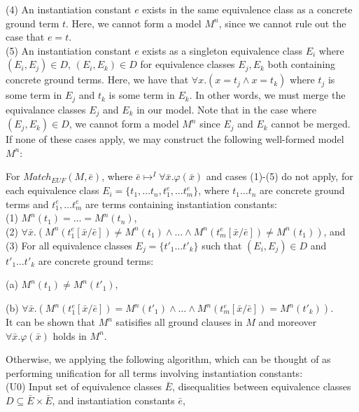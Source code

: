 \documentclass{llncs}
\begin{document}
(4) An instantiation constant $e$ exists in the same equivalence class as a concrete ground term $t$.
Here, we cannot form a model $M^n$, since we cannot rule out the case that $e = t$. \\

(5) An instantiation constant $e$ exists as a singleton equivalence class $E_i$ where $( E_i, E_j ) \in D$, $( E_i, E_k ) \in D$ for equivalence classes $E_j, E_k$ both containing concrete ground terms.
Here, we have that $\forall x. (x = t_j \wedge x = t_k)$ where $t_j$ is some term in $E_j$ and $t_k$ is some term in $E_k$.  
In other words, we must merge the equivalance classes $E_j$ and $E_k$ in our model.
Note that in the case where $( E_j, E_k ) \in D$, we cannot form a model $M^n$ since $E_j$ and $E_k$ cannot be merged. \\

If none of these cases apply, we may construct the following well-formed model $M^n$: 

For $Match_{EUF}( M, \bar{e} )$, where $\bar{e} \mapsto^I \forall \bar{x}. \varphi( \bar{x} )$ and cases (1)-(5) do not apply, for each equivalence class $E_i = \{ t_1, \ldots t_n, t^e_1, \ldots t^e_m \}$, where $t_1 \ldots t_n$ are concrete ground terms and $t^e_1, \ldots t^e_m$ are terms containing instantiation constants: \\
(1) $M^n( t_1 ) = \ldots = M^n( t_n )$, \\
(2) $\forall \bar{x}. ( M^n( t^e_1[\bar{x}/\bar{e}] ) \neq M^n( t_1 ) \wedge \ldots \wedge M^n( t^e_m[\bar{x}/\bar{e}] ) \neq M^n( t_1 ) )$, and \\
(3) For all equivalence classes $E_j = \{ t'_1 \ldots t'_k \}$ such that $( E_i, E_j ) \in D$ and $t'_1 \ldots t'_k$ are concrete ground terms:

(a) $M^n( t_1 ) \neq M^n( t'_1 )$,

(b) $\forall \bar{x}. ( M^n( t^e_1[\bar{x}/\bar{e}] ) = M^n( t'_1 ) \wedge \ldots \wedge M^n( t^e_m[\bar{x}/\bar{e}] ) = M^n( t'_k ) )$. \\

It can be shown that $M^n$ satisifies all ground clauses in $M$ and moreover $\forall \bar{x}. \varphi( \bar{x} )$ holds in $M^n$. 

Otherwise, we applying the following algorithm, which can be thought of as performing unification for all terms involving instantiation constants: \\

(U0) Input set of equivalence classes $\bar{E}$, disequalities between equivalence classes $D \subseteq \bar{E} \times \bar{E}$, and instantiation constants $\bar{e}$,
\end{document}
